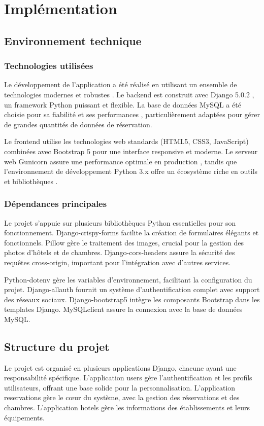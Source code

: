 \documentclass[12pt,a4paper]{report}
\begin{document}
\chapter{Implémentation}
\section{Environnement technique}
\subsection{Technologies utilisées}
Le développement de l'application a été réalisé en utilisant un ensemble de technologies modernes et robustes \cite{python-docs}. Le backend est construit avec Django 5.0.2 \cite{django-docs}, un framework Python puissant et flexible. La base de données MySQL a été choisie pour sa fiabilité et ses performances \cite{db-design}, particulièrement adaptées pour gérer de grandes quantités de données de réservation.

Le frontend utilise les technologies web standards (HTML5, CSS3, JavaScript) \cite{html5-docs} combinées avec Bootstrap 5 \cite{bootstrap} pour une interface responsive et moderne. Le serveur web Gunicorn assure une performance optimale en production \cite{django-pro}, tandis que l'environnement de développement Python 3.x offre un écosystème riche en outils et bibliothèques \cite{python-web}.

\subsection{Dépendances principales}
Le projet s'appuie sur plusieurs bibliothèques Python essentielles pour son fonctionnement. Django-crispy-forms facilite la création de formulaires élégants et fonctionnels. Pillow gère le traitement des images, crucial pour la gestion des photos d'hôtels et de chambres. Django-cors-headers assure la sécurité des requêtes cross-origin, important pour l'intégration avec d'autres services.

Python-dotenv gère les variables d'environnement, facilitant la configuration du projet. Django-allauth fournit un système d'authentification complet avec support des réseaux sociaux. Django-bootstrap5 intègre les composants Bootstrap dans les templates Django. MySQLclient assure la connexion avec la base de données MySQL.

\section{Structure du projet}
Le projet est organisé en plusieurs applications Django, chacune ayant une responsabilité spécifique. L'application users gère l'authentification et les profils utilisateurs, offrant une base solide pour la personnalisation. L'application reservations gère le cœur du système, avec la gestion des réservations et des chambres. L'application hotels gère les informations des établissements et leurs équipements.
\end{document}
